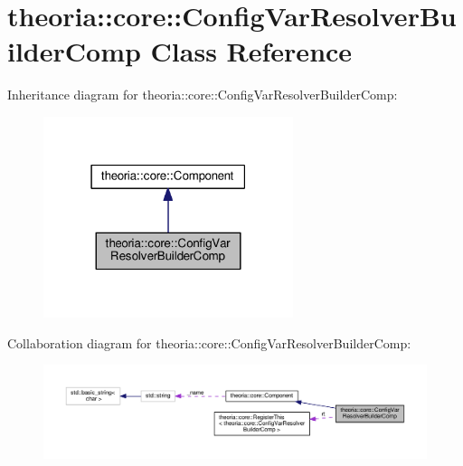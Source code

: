 \hypertarget{classtheoria_1_1core_1_1ConfigVarResolverBuilderComp}{}\section{theoria\+:\+:core\+:\+:Config\+Var\+Resolver\+Builder\+Comp Class Reference}
\label{classtheoria_1_1core_1_1ConfigVarResolverBuilderComp}


Inheritance diagram for theoria\+:\+:core\+:\+:Config\+Var\+Resolver\+Builder\+Comp\+:
\nopagebreak
\begin{figure}[H]
\begin{center}
\leavevmode
\includegraphics[width=207pt]{classtheoria_1_1core_1_1ConfigVarResolverBuilderComp__inherit__graph}
\end{center}
\end{figure}


Collaboration diagram for theoria\+:\+:core\+:\+:Config\+Var\+Resolver\+Builder\+Comp\+:
\nopagebreak
\begin{figure}[H]
\begin{center}
\leavevmode
\includegraphics[width=350pt]{classtheoria_1_1core_1_1ConfigVarResolverBuilderComp__coll__graph}
\end{center}
\end{figure}
